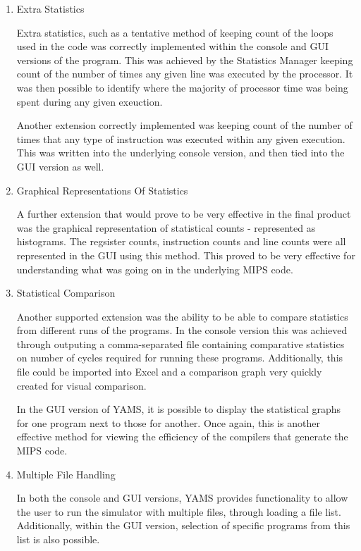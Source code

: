 \begin{enumerate}
\item Extra Statistics

Extra statistics, such as a tentative method of keeping count of the loops used in the code was correctly implemented within the console and GUI versions of the program. This was achieved by the Statistics Manager keeping count of the number of times any given line was executed by the processor. It was then possible to identify where the majority of processor time was being spent during any given exeuction.

Another extension correctly implemented was keeping count of the number of times that any type of instruction was executed within any given execution. This was written into the underlying console version, and then tied into the GUI version as well.

\item Graphical Representations Of Statistics

A further extension that would prove to be very effective in the final product was the graphical representation of statistical counts - represented as histograms. The regsister counts, instruction counts and line counts were all represented in the GUI using this method. This proved to be very effective for understanding what was going on in the underlying MIPS code. 

\item Statistical Comparison

Another supported extension was the ability to be able to compare statistics from different runs of the programs. In the console version this was achieved through outputing a comma-separated file containing comparative statistics on number of cycles required for running these programs. Additionally, this file could be imported into Excel and a comparison graph very quickly created for visual comparison.

In the GUI version of YAMS, it is possible to display the statistical graphs for one program next to those for another. Once again, this is another effective method for viewing the efficiency of the compilers that generate the MIPS code.

\item Multiple File Handling

In both the console and GUI versions, YAMS provides functionality to allow the user to run the simulator with multiple files, through loading a file list. Additionally, within the GUI version, selection of specific programs from this list is also possible.


\end{enumerate}
